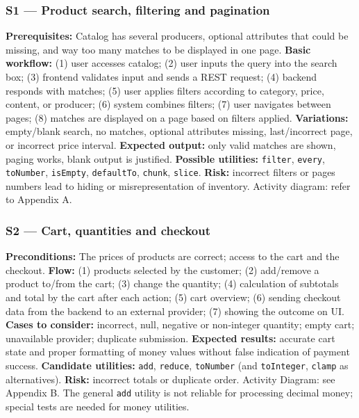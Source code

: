 \documentclass[
  9pt,
]{article}
\begin{document}
\subsubsection{S1 --- Product search, filtering and
pagination}\label{s1-product-search-filtering-and-pagination}

\textbf{Prerequisites:} Catalog has several producers, optional
attributes that could be missing, and way too many matches to be
displayed in one page. \textbf{Basic workflow:} (1) user accesses
catalog; (2) user inputs the query into the search box; (3) frontend
validates input and sends a REST request; (4) backend responds with
matches; (5) user applies filters according to category, price, content,
or producer; (6) system combines filters; (7) user navigates between
pages; (8) matches are displayed on a page based on filters applied.
\textbf{Variations:} empty/blank search, no matches, optional attributes
missing, last/incorrect page, or incorrect price interval.
\textbf{Expected output:} only valid matches are shown, paging works,
blank output is justified. \textbf{Possible utilities:} \texttt{filter},
\texttt{every}, \texttt{toNumber}, \texttt{isEmpty}, \texttt{defaultTo},
\texttt{chunk}, \texttt{slice}. \textbf{Risk:} incorrect filters or
pages numbers lead to hiding or misrepresentation of inventory. Activity
diagram: refer to Appendix A.

\subsubsection{S2 --- Cart, quantities and
checkout}\label{s2-cart-quantities-and-checkout}

\textbf{Preconditions:} The prices of products are correct; access to
the cart and the checkout. \textbf{Flow:} (1) products selected by the
customer; (2) add/remove a product to/from the cart; (3) change the
quantity; (4) calculation of subtotals and total by the cart after each
action; (5) cart overview; (6) sending checkout data from the backend to
an external provider; (7) showing the outcome on UI. \textbf{Cases to
consider:} incorrect, null, negative or non-integer quantity; empty
cart; unavailable provider; duplicate submission. \textbf{Expected
results:} accurate cart state and proper formatting of money values
without false indication of payment success. \textbf{Candidate
utilities:} \texttt{add}, \texttt{reduce}, \texttt{toNumber} (and
\texttt{toInteger}, \texttt{clamp} as alternatives). \textbf{Risk:}
incorrect totals or duplicate order. Activity Diagram: see Appendix B.
The general \texttt{add} utility is not reliable for processing decimal
money; special tests are needed for money utilities.
\end{document}

